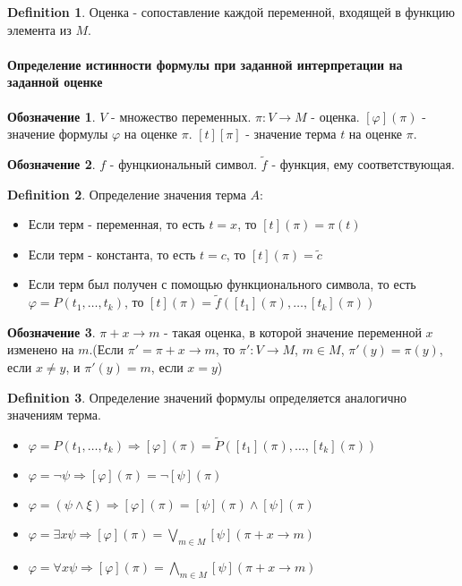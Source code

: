 \documentclass[a4paper]{article}
\theoremstyle{plain}
\theoremstyle{remark}
\theoremstyle{definition}
\newtheorem{definition}{Definition}
\newtheorem*{designation}{Обозначение}
\begin{document}
\begin{definition}
	Оценка - сопоставление каждой переменной, входящей в функцию элемента из $M$.
\end{definition}

\paragraph{Определение истинности формулы при заданной интерпретации на заданной оценке}

\begin{designation}
	$V$ - множество переменных. $\pi: V \rightarrow M$ - оценка. $[\varphi](\pi)$ - значение формулы $\varphi$ на оценке $\pi$. $[t][\pi]$ - значение терма $t$ на оценке $\pi$.
\end{designation}

\begin{designation}
	$f$ - фунцкиональный символ. $\tilde{f}$ - функция, ему соответствующая.
\end{designation}

\begin{definition}
	Определение значения терма $A$:
	\begin{itemize}
		\item Если терм - переменная, то есть $t = x$, то $[t](\pi) = \pi(t)$
		\item Если терм - константа, то есть $t = c$, то $[t](\pi) = \tilde{c}$
		\item Если терм был получен с помощью функционального символа, то есть $\varphi = P(t_1, \ldots, t_k)$, то $[t](\pi) = \tilde{f}([t_1](\pi), \ldots, [t_k](\pi))$
	\end{itemize}
\end{definition}

\begin{designation}
	$\pi + x \rightarrow m$ - такая оценка, в которой значение переменной $x$ изменено на $m$.(Если $\pi' = \pi + x \rightarrow m$, то $\pi': V \rightarrow M$, $m \in M$, $\pi'(y) = \pi(y)$, если $x \neq y$, и $\pi'(y) = m$, если $x = y$)
\end{designation}

\begin{definition}
	Определение значений формулы определяется аналогично значениям терма.
	\begin{itemize}
		\item $\varphi = P(t_1, \ldots, t_k) \Rightarrow [\varphi](\pi) = \tilde{P}([t_1](\pi), \ldots, [t_k](\pi))$
		\item $\varphi = \lnot \psi \Rightarrow [\varphi](\pi) = \lnot [\psi](\pi)$
		\item $\varphi = (\psi \land \xi) \Rightarrow [\varphi](\pi) = [\psi](\pi) \land [\psi](\pi)$
		\item $\varphi = \exists x \psi \Rightarrow [\varphi](\pi) = \bigvee_{m \in M} [\psi](\pi + x \rightarrow m)$
		\item $\varphi = \forall x \psi \Rightarrow [\varphi](\pi) = \bigwedge_{m \in M} [\psi](\pi + x \rightarrow m)$
	\end{itemize}
\end{definition}
\end{document}
